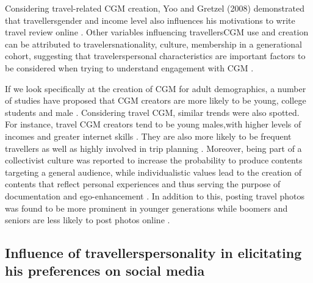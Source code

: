 Considering travel-related CGM creation, Yoo and Gretzel (2008) demonstrated that travellers\textquotesingle gender and income level also influences his motivations to write travel review online \cite{yoo2008motivates}. Other variables influencing travellers\textquotesingle  CGM use and creation can be attributed to travelers\textquotesingle  nationality, culture, membership in a generational cohort, suggesting that travelers\textquotesingle personal characteristics are important factors to be considered when trying to understand engagement with CGM \cite{yoo2011influence}.



If we look specifically at the creation of CGM for adult demographics, a number of studies have proposed that CGM creators are more likely to be young, college students and male \cite{yoo2011influence}.
Considering travel CGM, similar trends were also spotted. For instance, travel CGM creators tend to be young males,with higher levels of incomes and greater internet skills \cite{yoo2008understanding}. They are also more likely to be frequent travellers as well as highly involved in trip planning \cite{gretzel2008use}. Moreover, being part of a collectivist culture was reported to increase the probability to produce contents targeting a general audience, while individualistic values lead to the creation of contents that reflect personal experiences and thus serving the purpose of documentation and ego-enhancement \cite{lee2009social}. In addition to this, posting travel photos was found to be more prominent in younger generations while boomers and seniors are less likely to post photos online \cite{yoo2011influence}.

    
\subsection{Influence of travellers\textquotesingle  personality in elicitating his preferences on social media}\label{3}



